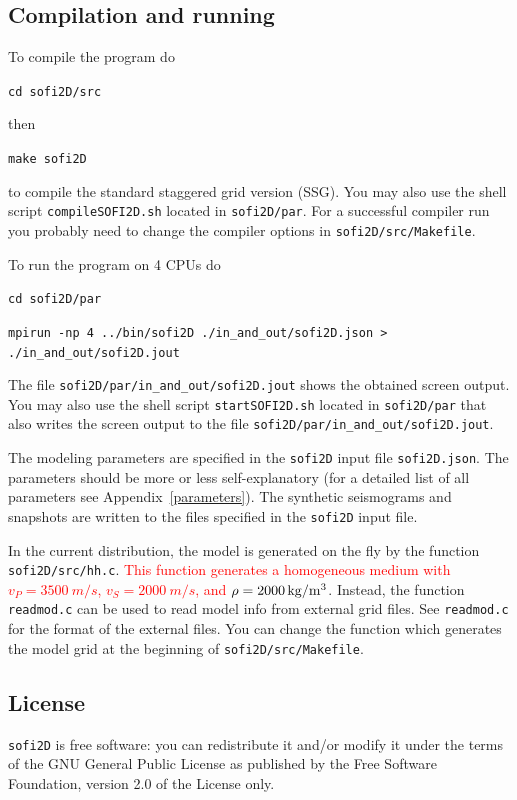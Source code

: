 \documentclass[11pt,english,a4paper]{article}
\begin{document}
\subsection{Compilation and running}
\label{qguide}
To compile the program do

\texttt{cd sofi2D/src}

then

\texttt{make sofi2D}

to compile the standard staggered grid version (SSG). You may also use the shell script \texttt{compileSOFI2D.sh} located in \texttt{sofi2D/par}. For a successful compiler run you probably need to change the compiler options in \texttt{sofi2D/src/Makefile}. 

To run the program on 4 CPUs do

\texttt{cd sofi2D/par}

\texttt{mpirun -np 4 ../bin/sofi2D ./in\_and\_out/sofi2D.json > ./in\_and\_out/sofi2D.jout}

The file \texttt{sofi2D/par/in\_and\_out/sofi2D.jout} shows the obtained screen output. You may also use the shell script \texttt{startSOFI2D.sh} located in \texttt{sofi2D/par} that also writes the screen output to the file \texttt{sofi2D/par/in\_and\_out/sofi2D.jout}.

The modeling parameters are specified in the \texttt{sofi2D} input file \texttt{sofi2D.json}. The parameters should be more or less self-explanatory (for a detailed list of all parameters see Appendix~\ref{parameters}). The synthetic seismograms and snapshots are written to the files specified in the \texttt{sofi2D} input file.

In the current distribution, the model is generated on the fly by the function \texttt{sofi2D/src/hh.c}. \textcolor{red}{This function generates a homogeneous medium with $v_P=\SI{3500}{m/s}$, $v_S=\SI{2000}{m/s}$, and $\rho=\SI{2000}{kg/m\cubed}$}. Instead, the function \texttt{readmod.c} can be used to read model info from external grid files. See \texttt{readmod.c} for the format of the external files. You can change the function which generates the model grid at the beginning of \texttt{sofi2D/src/Makefile}.

\subsection{License}
\label{license}
\texttt{sofi2D} is free software: you can redistribute it and/or modify it under the terms of the GNU General Public License as published by the Free Software Foundation, version 2.0 of the License only.
 
\end{document}
